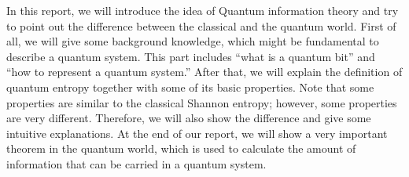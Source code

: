 In this report, we will introduce the idea of Quantum information theory and try to point out the difference between the classical and the quantum world.
First of all, we will give some background knowledge, which might be fundamental to describe a quantum system.
This part includes ``what is a quantum bit'' and ``how to represent a quantum system.''
After that, we will explain the definition of quantum entropy together with some of its basic properties.
Note that some properties are similar to the classical Shannon entropy; however, some properties are very different.
Therefore, we will also show the difference and give some intuitive explanations.
At the end of our report, we will show a very important theorem in the quantum world, which is used to calculate the amount of information that can be carried in a quantum system. 